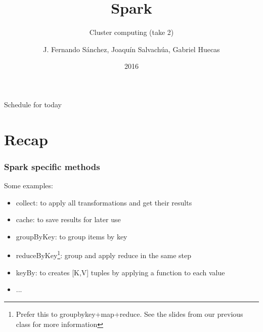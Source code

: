 \documentclass{beamer}
\title{Spark}
\subtitle{Cluster computing (take 2)}
\author{J. Fernando Sánchez, Joaquín Salvachúa, Gabriel Huecas }
\institute{Universidad Politécnica de Madrid}
\date{2016}
\begin{document}
\begin{frame}
\titlepage{}
\end{frame}

\begin{frame}{Schedule for today}
  \tableofcontents
\end{frame}

\section{Recap}

{
  \pagecolor{black}

\begin{frame}[plain]
\end{frame}
}

\begin{frame}[fragile]
  \frametitle{Spark specific methods}

  Some examples:

  \begin{itemize}
    \item collect: to apply all transformations and get their results
    \item cache: to save results for later use
    \item groupByKey: to group items by key
    \item reduceByKey\footnote{Prefer this to groupbykey+map+reduce. See the slides from our previous class for more information}: group and apply reduce in the same step
    \item<2-> keyBy: to creates [K,V] tuples by applying a function to each value
    \item<3-> ...
  \end{itemize}
\end{frame}
\end{document}
